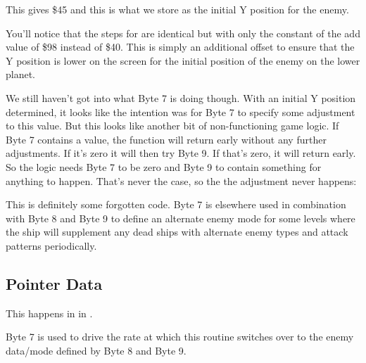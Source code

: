 %


This gives \$45 and this is what we store as the initial Y position for the enemy.

You'll notice that the steps for  are identical but with only the constant of the
add value of \$98 instead of \$40. This is simply an additional offset to ensure that the Y position is lower on the screen
for the initial position of the enemy on the lower planet.

We still haven't got into what Byte 7 is doing though. With an initial Y position determined, it looks like the intention was
for Byte 7 to specify some adjustment to this value. But this looks like another bit of non-functioning game logic. If
Byte 7 contains a value, the function will return early without any further adjustments. If it's zero it will then try
Byte 9. If that's zero, it will return early. So the logic needs Byte 7 to be zero and Byte 9 to contain something for 
anything to happen. That's never the case, so the the adjustment never happens:

%


This is definitely some forgotten code. Byte 7 is elsewhere used in combination with Byte 8 and Byte 9 to define an alternate
enemy mode for some levels where the ship will supplement any dead ships with alternate enemy types and attack patterns periodically.


\subsection{Pointer Data}
This happens in  in . 

%


Byte 7 is used to drive the rate at which this routine switches over to the enemy data/mode defined by Byte 8 and Byte 9.

%


